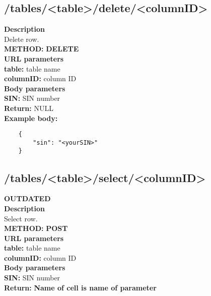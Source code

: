 \documentclass[a4paper, 12pt]{report}
\begin{document}
\subsection{/tables/<table>/delete/<columnID>}
\textbf{\color{redText} Description} \\
Delete row. \\
\textbf{\color{redText} METHOD: } \textbf{DELETE} \\
\textbf{\color{redText} URL parameters} \\
\textbf{table: } table name\\
\textbf{columnID: } column ID\\
\textbf{\color{redText} Body parameters} \\
\textbf{SIN: } SIN number\\
\textbf{\color{redText} Return: } NULL \\
\textbf{\color{redText} Example body: }
\begin{lstlisting}
    {
        "sin": "<yourSIN>"
    }
\end{lstlisting}

\subsection{/tables/<table>/select/<columnID>}
\textbf{\color{red} OUTDATED}\\
\textbf{\color{redText} Description} \\
Select row. \\
\textbf{\color{redText} METHOD: } \textbf{POST} \\
\textbf{\color{redText} URL parameters} \\
\textbf{table: } table name\\
\textbf{columnID: } column ID\\
\textbf{\color{redText} Body parameters} \\
\textbf{SIN: } SIN number\\
\textbf{\color{redText} Return: } 
\textbf{Name of cell is name of parameter}\\
\end{document}
